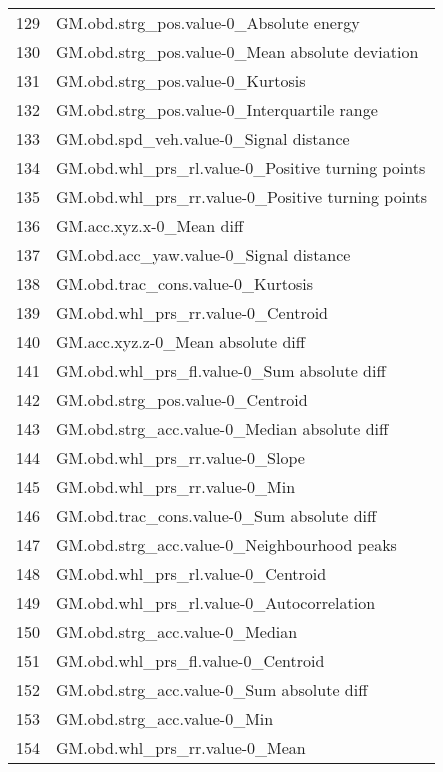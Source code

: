 \begin{tabular}{ll}
129 &            GM.obd.strg\_pos.value-0\_Absolute energy \\
130 &    GM.obd.strg\_pos.value-0\_Mean absolute deviation \\
131 &                   GM.obd.strg\_pos.value-0\_Kurtosis \\
132 &        GM.obd.strg\_pos.value-0\_Interquartile range \\
133 &             GM.obd.spd\_veh.value-0\_Signal distance \\
134 &  GM.obd.whl\_prs\_rl.value-0\_Positive turning points \\
135 &  GM.obd.whl\_prs\_rr.value-0\_Positive turning points \\
136 &                           GM.acc.xyz.x-0\_Mean diff \\
137 &             GM.obd.acc\_yaw.value-0\_Signal distance \\
138 &                  GM.obd.trac\_cons.value-0\_Kurtosis \\
139 &                 GM.obd.whl\_prs\_rr.value-0\_Centroid \\
140 &                  GM.acc.xyz.z-0\_Mean absolute diff \\
141 &        GM.obd.whl\_prs\_fl.value-0\_Sum absolute diff \\
142 &                   GM.obd.strg\_pos.value-0\_Centroid \\
143 &       GM.obd.strg\_acc.value-0\_Median absolute diff \\
144 &                    GM.obd.whl\_prs\_rr.value-0\_Slope \\
145 &                      GM.obd.whl\_prs\_rr.value-0\_Min \\
146 &         GM.obd.trac\_cons.value-0\_Sum absolute diff \\
147 &        GM.obd.strg\_acc.value-0\_Neighbourhood peaks \\
148 &                 GM.obd.whl\_prs\_rl.value-0\_Centroid \\
149 &          GM.obd.whl\_prs\_rl.value-0\_Autocorrelation \\
150 &                     GM.obd.strg\_acc.value-0\_Median \\
151 &                 GM.obd.whl\_prs\_fl.value-0\_Centroid \\
152 &          GM.obd.strg\_acc.value-0\_Sum absolute diff \\
153 &                        GM.obd.strg\_acc.value-0\_Min \\
154 &                     GM.obd.whl\_prs\_rr.value-0\_Mean \\

\end{tabular}
